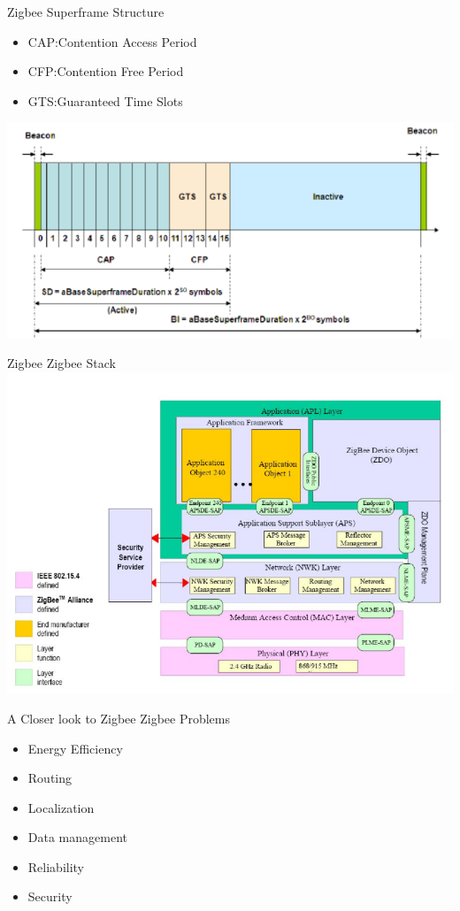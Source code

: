 \documentclass[serif,Blue]{beamer}
\begin{document}
\begin{frame}{Zigbee}
	Superframe Structure
	\begin{itemize}\justifying{}
		\item CAP:\@ Contention Access Period
		\item CFP:\@ Contention Free Period
		\item GTS:\@ Guaranteed Time Slots
	\end{itemize}
	\center\includegraphics[scale=.3]{img/sframe.png}
\end{frame}

\begin{frame}{Zigbee}
	Zigbee Stack
	\center\includegraphics[scale=1]{img/zstack.png}
\end{frame}



\begin{frame}{A Closer look to Zigbee}
	Zigbee Problems
	\begin{itemize}\justifying{}
		\item Energy Efficiency
		\item Routing
		\item Localization
		\item Data management
		\item Reliability
		\item Security
	\end{itemize}
\end{frame}
\end{document}
